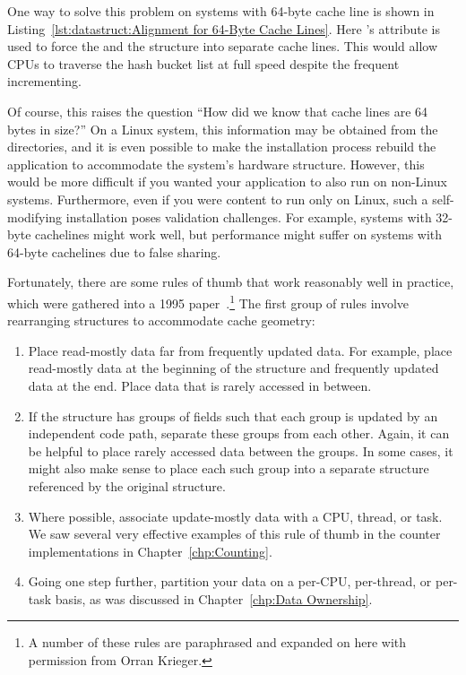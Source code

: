One way to solve this problem on systems with 64-byte cache line is shown in
Listing~\ref{lst:datastruct:Alignment for 64-Byte Cache Lines}.
Here \GCC's  attribute is used to force the 
and the  structure into separate cache lines.
This would allow CPUs to traverse the hash bucket list at full speed
despite the frequent incrementing.

Of course, this raises the question ``How did we know that cache lines
are 64 bytes in size?''
On a Linux system, this information may be obtained from the
 directories, and it is even
possible to make the installation process rebuild the application to
accommodate the system's hardware structure.
However, this would be more difficult if you wanted your application to
also run on non-Linux systems.
Furthermore, even if you were content to run only on Linux, such a
self-modifying installation poses validation challenges.
For example, systems with 32-byte cachelines might work well, but
performance might suffer on systems with 64-byte cachelines due
to false sharing.

Fortunately, there are some rules of thumb that work reasonably well in
practice, which were gathered into a 1995
paper~\cite{BenjaminGamsa95a}.\footnote{
	A number of these rules are paraphrased and expanded on here
	with permission from Orran Krieger.}
The first group of rules involve rearranging structures to accommodate
cache geometry:

\begin{enumerate}
\item	Place read-mostly data far from frequently updated data.
	For example, place read-mostly data at the beginning of the
	structure and frequently updated data at the end.
	Place data that is rarely accessed in between.
\item	If the structure has groups of fields such that each group is
	updated by an independent code path, separate these groups
	from each other.
	Again, it can be helpful to place rarely accessed data
	between the groups.
	In some cases, it might also make sense to place each such group
	into a separate structure referenced by the original structure.
\item	Where possible, associate update-mostly data with a CPU, thread,
	or task.
	We saw several very effective examples of this rule of thumb
	in the counter implementations in
	Chapter~\ref{chp:Counting}.
\item	Going one step further, partition your data on a per-CPU,
	per-thread, or per-task basis, as was discussed in
	Chapter~\ref{chp:Data Ownership}.
\end{enumerate}

